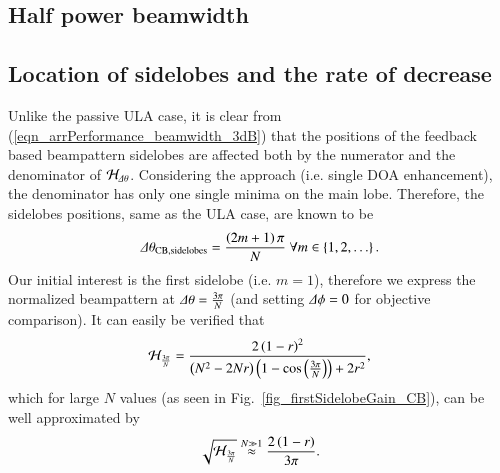 \subsection*{Half power beamwidth}

\subsection*{Location of sidelobes and the rate of decrease}
Unlike the passive ULA case, it is clear from (\ref{eqn_arrPerformance_beamwidth_3dB}) that the positions of the feedback based beampattern sidelobes are affected both by the numerator and the denominator of $\mathcal{H}_{\Delta\theta}$. Considering the \coefSetName{} approach (i.e. single DOA enhancement), the denominator has only one single minima on the main lobe. Therefore, the sidelobes positions, same as the ULA case, are known \cite{VanTrees2002DetectionIV} to be 
\begin{equation}
    \label{eqn_CB_sidelobesLocations}
    \dTheta_{\coefSetName{},\text{sidelobes}} = \frac{\rBrace{2m+1}\pi}{N}\ \forall m\in\cBrace{1,2,\hdots}.
\end{equation}
Our initial interest is the first sidelobe (i.e. $m=1$), therefore we express the normalized beampattern at $\Delta\theta = \frac{3\pi}{N}$ (and setting $\Delta\phi=0$ for objective comparison). It can easily be verified that 
\begin{equation*}
    \mathcal{H}_{\frac{3\pi}{N}}
    =
    \frac{
    2\left({1-r}\right)^{2}
    }{
    \left({N^{2}-2Nr}\right)\left({1-\cos{\left({\frac{3\pi}{N}}\right)}}\right)+2r^{2}
    },
\end{equation*}
which for large $N$ values (as seen in Fig.~\ref{fig_firstSidelobeGain_CB}), can be well approximated by
\begin{equation*}
    \sqrt{\mathcal{H}_{\frac{3\pi}{N}}}
    \overset{N\gg1}{\approx}
    \frac{
    2\left({1-r}\right)
    }{
    3\pi
    }.
\end{equation*}
